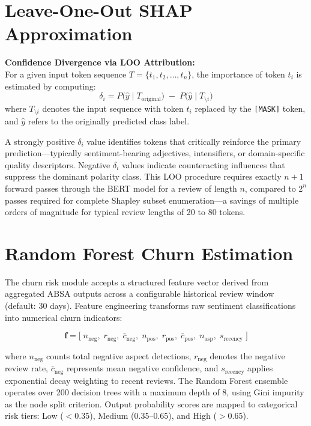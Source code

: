 \documentclass[12pt,a4paper]{report}
\begin{document}
\section{Leave-One-Out SHAP Approximation}

\begin{formulabox}
\textbf{Confidence Divergence via LOO Attribution:}\\[4pt]
For a given input token sequence $T = \{t_1, t_2, \ldots, t_n\}$, the importance of token $t_i$ is estimated by computing:
\[
\delta_i = P\bigl(\hat{y} \;\big|\; T_{\text{original}}\bigr) \;-\; P\bigl(\hat{y} \;\big|\; T_{\setminus i}\bigr)
\]
where $T_{\setminus i}$ denotes the input sequence with token $t_i$ replaced by the \texttt{[MASK]} token, and $\hat{y}$ refers to the originally predicted class label.
\end{formulabox}

A strongly positive $\delta_i$ value identifies tokens that critically reinforce the primary prediction—typically sentiment-bearing adjectives, intensifiers, or domain-specific quality descriptors. Negative $\delta_i$ values indicate counteracting influences that suppress the dominant polarity class. This LOO procedure requires exactly $n+1$ forward passes through the BERT model for a review of length $n$, compared to $2^n$ passes required for complete Shapley subset enumeration—a savings of multiple orders of magnitude for typical review lengths of 20 to 80 tokens.

\section{Random Forest Churn Estimation}
The churn risk module accepts a structured feature vector derived from aggregated ABSA outputs across a configurable historical review window (default: 30 days). Feature engineering transforms raw sentiment classifications into numerical churn indicators:

\begin{equation}
\mathbf{f} = \bigl[\;n_{\text{neg}},\; r_{\text{neg}},\; \bar{c}_{\text{neg}},\; n_{\text{pos}},\; r_{\text{pos}},\; \bar{c}_{\text{pos}},\; n_{\text{asp}},\; s_{\text{recency}}\;\bigr]
\end{equation}

where $n_{\text{neg}}$ counts total negative aspect detections, $r_{\text{neg}}$ denotes the negative review rate, $\bar{c}_{\text{neg}}$ represents mean negative confidence, and $s_{\text{recency}}$ applies exponential decay weighting to recent reviews. The Random Forest ensemble operates over 200 decision trees with a maximum depth of 8, using Gini impurity as the node split criterion. Output probability scores are mapped to categorical risk tiers: Low ($<0.35$), Medium ($0.35$--$0.65$), and High ($>0.65$).
\end{document}
